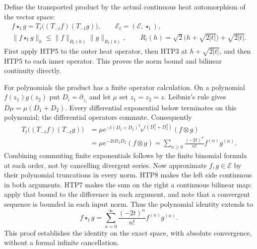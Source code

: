 Define the transported product by the actual continuous heat
automorphism of the vector space:
\begin{equation}\tag{HTP8}
\begin{gathered}
 f\star_tg=T_t\bigl((T_{-t}f)(T_{-t}g)\bigr),\qquad
 \mathcal E_t=(\mathcal E,\star_t),\\
 \|f\star_tg\|_h\le\|f\|_{R_t(h)}\|g\|_{R_t(h)},\qquad
 R_t(h)=\sqrt2\bigl(h+\sqrt{2|t|}\bigr)+\sqrt{2|t|}.
\end{gathered}
\end{equation}
First apply HTP5 to the outer heat operator, then HTP3 at
$h+\sqrt{2|t|}$, and then HTP5 to each inner operator.
This proves the norm bound and bilinear continuity directly.

For polynomials the product has a finite operator calculation.
On a polynomial $f(z_1)g(z_2)$ put $D_i=\partial_{z_i}$ and
let $\mu$ set $z_1=z_2=z$. Leibniz's rule gives
$D\mu=\mu(D_1+D_2)$. Every differential exponential below
terminates on this polynomial; the differential operators
commute. Consequently
\begin{equation}\tag{HTP9}
 \begin{split}
 T_t\bigl((T_{-t}f)(T_{-t}g)\bigr)
 &=\mu e^{-t(D_1+D_2)^2}e^{t(D_1^2+D_2^2)}(f\otimes g)\\
 &=\mu e^{-2tD_1D_2}(f\otimes g)
   =\sum_{n\ge0}\frac{(-2t)^n}{n!}f^{(n)}g^{(n)}.
 \end{split}
\end{equation}
Combining commuting finite exponentials follows by the finite
binomial formula at each order, not by cancelling divergent
series. Now approximate $f,g\in\mathcal E$ by their polynomial
truncations in every norm. HTP8 makes the left side continuous
in both arguments. HTP7 makes the sum on the right a continuous
bilinear map: apply that bound to the difference in each
argument, and note that a convergent sequence is bounded in
each input norm. Thus the polynomial identity extends to
\begin{equation}\tag{HTP10}
 \boxed{\displaystyle
 f\star_tg=\sum_{n=0}^{\infty}\frac{(-2t)^n}{n!}
                                      f^{(n)}g^{(n)}.}
\end{equation}
This proof establishes the identity on the exact space, with
absolute convergence, without a formal infinite cancellation.

